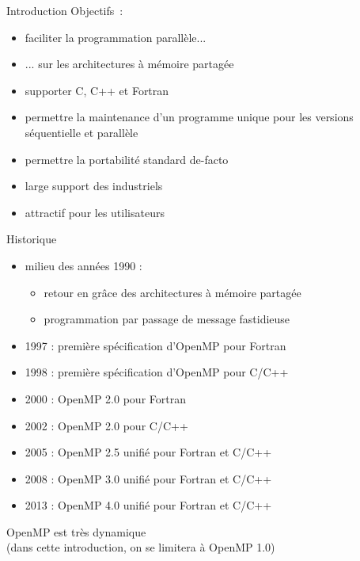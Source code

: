 %
%

\def\inc{inc7-openmp}




\begin {frame} {Introduction}
    Objectifs~:
    
    \begin {itemize}
	\item faciliter la programmation parallèle...
	\item ...  sur les architectures à mémoire partagée
	\item supporter C, C++ et Fortran
	\item permettre la maintenance d'un programme unique pour
	    les versions séquentielle et parallèle
	\item permettre la portabilité \implique standard de-facto
	\item large support des industriels
	\item attractif pour les utilisateurs
    \end {itemize}

\end {frame}

\begin {frame} {Historique}

    \begin {itemize}
	\item milieu des années 1990 :
	    \begin {itemize}
		\item retour en grâce des architectures à mémoire partagée
		\item programmation par passage de message fastidieuse
	    \end {itemize}
	\item 1997 : première spécification d'OpenMP pour Fortran
	\item 1998 : première spécification d'OpenMP pour C/C++
	\item 2000 : OpenMP 2.0 pour Fortran
	\item 2002 : OpenMP 2.0 pour C/C++
	\item 2005 : OpenMP 2.5 unifié pour Fortran et C/C++
	\item 2008 : OpenMP 3.0 unifié pour Fortran et C/C++
	\item 2013 : OpenMP 4.0 unifié pour Fortran et C/C++
    \end {itemize}

    \implique OpenMP est très dynamique \\
    (dans cette introduction, on se limitera à OpenMP 1.0)

\end {frame}

